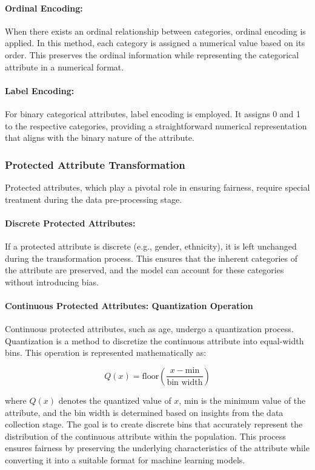 \paragraph{Ordinal Encoding:}
When there exists an ordinal relationship between categories, ordinal encoding is applied. In this method, each category is assigned a numerical value based on its order. This preserves the ordinal information while representing the categorical attribute in a numerical format.

\paragraph{Label Encoding:}
For binary categorical attributes, label encoding is employed. It assigns 0 and 1 to the respective categories, providing a straightforward numerical representation that aligns with the binary nature of the attribute.

\subsubsection{Protected Attribute Transformation}

Protected attributes, which play a pivotal role in ensuring fairness, require special treatment during the data pre-processing stage.

\paragraph{Discrete Protected Attributes:}
If a protected attribute is discrete (e.g., gender, ethnicity), it is left unchanged during the transformation process. This ensures that the inherent categories of the attribute are preserved, and the model can account for these categories without introducing bias.

\paragraph{Continuous Protected Attributes: Quantization Operation}
Continuous protected attributes, such as age, undergo a quantization process. Quantization is a method to discretize the continuous attribute into equal-width bins. This operation is represented mathematically as:

\[ Q(x) = \text{{floor}}\left(\frac{{x - \text{{min}}}}{{\text{{bin width}}}}\right) \]

where \( Q(x) \) denotes the quantized value of \( x \), \(\text{{min}}\) is the minimum value of the attribute, and the bin width is determined based on insights from the data collection stage. The goal is to create discrete bins that accurately represent the distribution of the continuous attribute within the population. This process ensures fairness by preserving the underlying characteristics of the attribute while converting it into a suitable format for machine learning models.

